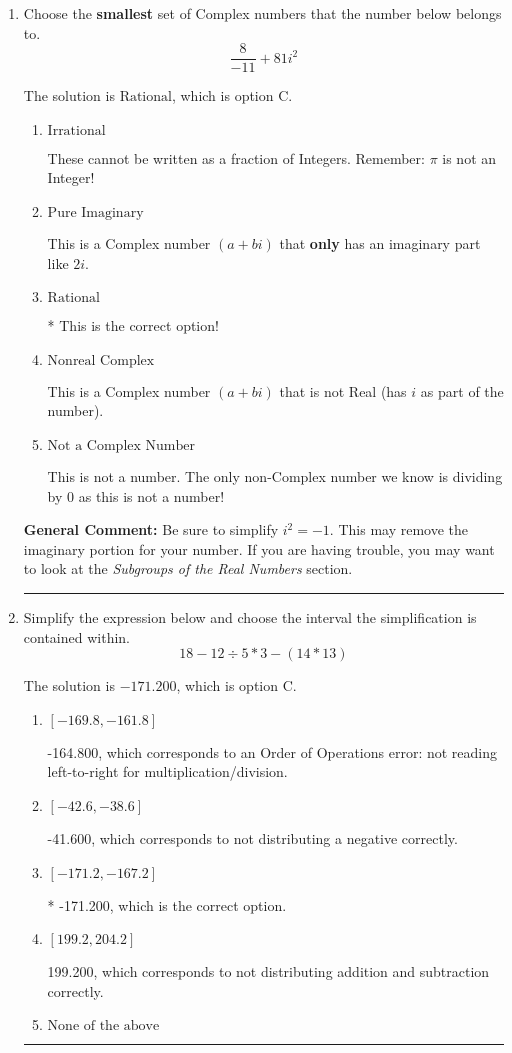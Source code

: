 \documentclass{extbook}[14pt]
\newcommand{\litem}[1]{\item #1

\rule{\textwidth}{0.4pt}}
\begin{document}
\begin{enumerate}\litem{
Choose the \textbf{smallest} set of Complex numbers that the number below belongs to.
\[ \frac{8}{-11}+81i^2 \]

The solution is \( \text{Rational} \), which is option C.\begin{enumerate}[label=\Alph*.]
\item \( \text{Irrational} \)

These cannot be written as a fraction of Integers. Remember: $\pi$ is not an Integer!
\item \( \text{Pure Imaginary} \)

This is a Complex number $(a+bi)$ that \textbf{only} has an imaginary part like $2i$.
\item \( \text{Rational} \)

* This is the correct option!
\item \( \text{Nonreal Complex} \)

This is a Complex number $(a+bi)$ that is not Real (has $i$ as part of the number).
\item \( \text{Not a Complex Number} \)

This is not a number. The only non-Complex number we know is dividing by 0 as this is not a number!
\end{enumerate}

\textbf{General Comment:} Be sure to simplify $i^2 = -1$. This may remove the imaginary portion for your number. If you are having trouble, you may want to look at the \textit{Subgroups of the Real Numbers} section.
}
\litem{
Simplify the expression below and choose the interval the simplification is contained within.
\[ 18 - 12 \div 5 * 3 - (14 * 13) \]

The solution is \( -171.200 \), which is option C.\begin{enumerate}[label=\Alph*.]
\item \( [-169.8, -161.8] \)

 -164.800, which corresponds to an Order of Operations error: not reading left-to-right for multiplication/division.
\item \( [-42.6, -38.6] \)

 -41.600, which corresponds to not distributing a negative correctly.
\item \( [-171.2, -167.2] \)

* -171.200, which is the correct option.
\item \( [199.2, 204.2] \)

 199.200, which corresponds to not distributing addition and subtraction correctly.
\item \( \text{None of the above} \)


\end{enumerate}}
\end{enumerate}
\end{document}
